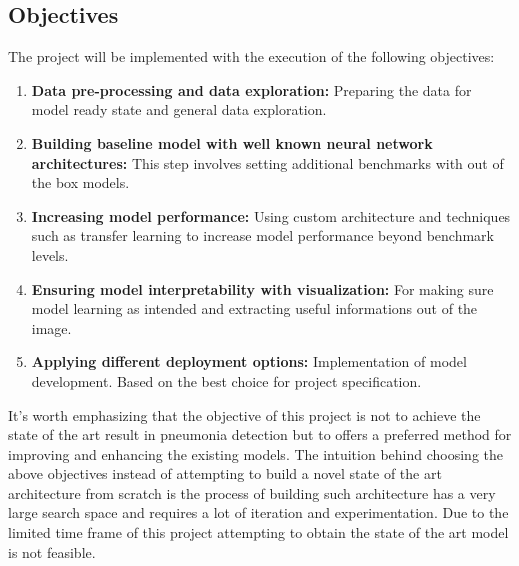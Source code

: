 \subsection{Objectives}
The project will be implemented with the execution of the following objectives:
\begin{enumerate}
    \item \textbf{Data pre-processing and data exploration: }Preparing the data for model ready state and general data exploration.
    \item \textbf{Building baseline model with well known neural network architectures: }This step involves setting additional benchmarks with out of the box models.
    \item \textbf{Increasing model performance: }Using custom architecture and techniques such as transfer learning to increase model performance beyond benchmark levels.
    \item \textbf{Ensuring model interpretability with visualization: } For making sure model learning as intended and extracting useful informations out of the image.
    \item \textbf{Applying different deployment options: } Implementation of model development. Based on the best choice for project specification.
\end{enumerate}
It's worth emphasizing that the objective of this project is not to achieve the state of the art result in pneumonia detection but to offers a preferred method for improving and enhancing the existing models.
The intuition behind choosing the above objectives instead of attempting to build a novel state of the art architecture from scratch is the process of building such architecture has a very large search space and requires a lot of iteration and experimentation. 
Due to the limited time frame of this project attempting to obtain the state of the art model is not feasible. 


